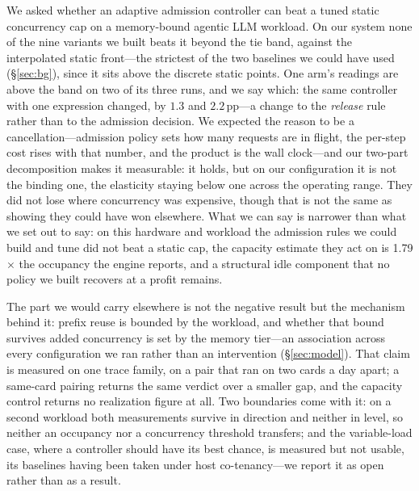 We asked whether an adaptive admission controller can beat a tuned static
concurrency cap on a memory-bound agentic LLM workload. On our system none of the
nine variants we built beats it beyond the tie band, against the interpolated
static front---the strictest of the two baselines we could have used
(\S\ref{sec:bg}), since it sits above the discrete static points. One arm's
readings are above the band on two of its three runs, and we say which: the same
controller with one expression changed, by $1.3$ and
$2.2$\,pp---a change to the \emph{release} rule rather than to the admission
decision. We expected the reason to be a cancellation---admission policy sets how
many requests are in flight, the per-step cost rises with that number, and the
product is the wall clock---and our two-part decomposition makes it measurable: it
holds, but on our configuration it is not the binding one, the elasticity staying
below one across the operating range. They
did not lose where concurrency was expensive, though that is not the same as
showing they could have won elsewhere. What we can say is narrower than what we
set out to say: on this hardware and workload the admission rules we could build
and tune did not beat a static cap, the capacity estimate they act on is
1.79$\times$ the occupancy the engine reports, and a structural idle component
that no policy we built recovers at a profit remains.

The part we would carry elsewhere is not the negative result but the mechanism
behind it: prefix reuse is bounded by the workload, and whether that bound
survives added concurrency is set by the memory tier---an association across every
configuration we ran rather than an intervention (\S\ref{sec:model}). That claim
is measured on one trace family, on a pair that ran on two cards a day apart; a
same-card pairing returns the same verdict over a smaller gap, and the capacity
control returns no realization figure at all. Two boundaries come with it: on a
second workload both measurements survive in direction and neither in level, so
neither an occupancy nor a concurrency threshold transfers; and the variable-load
case, where a controller should have its best chance, is measured but not usable,
its baselines having been taken under host co-tenancy---we report it as open
rather than as a result.
